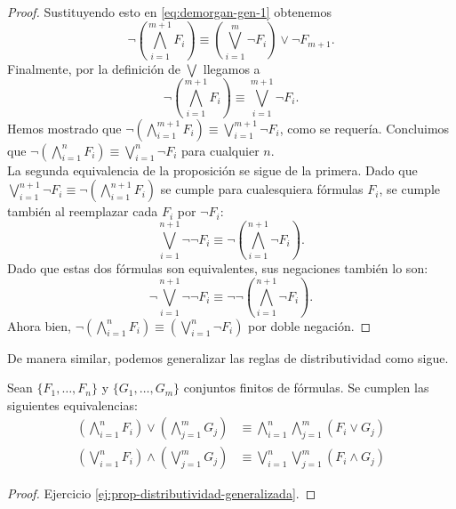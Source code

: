 \message{ !name(main.tex)}\documentclass[12pt,a4paper]{book}
\begin{document}
\begin{proof}
        Sustituyendo esto en \eqref{eq:demorgan-gen-1} obtenemos
        \begin{equation*}
            \neg\left(\bigwedge_{i=1}^{m+1}F_{i}\right)\equiv\left(\bigvee_{i=1}^{m}\neg F_{i}\right)\vee\neg F_{m+1}.
        \end{equation*}
        Finalmente, por la definición de $\bigvee$ llegamos a
        \begin{equation*}
            \neg\left(\bigwedge_{i=1}^{m+1}F_{i}\right)\equiv\bigvee_{i=1}^{m+1}\neg F_{i}.
        \end{equation*}
        Hemos mostrado que $\neg\left(\bigwedge_{i=1}^{m+1}F_{i}\right)\equiv\bigvee_{i=1}^{m+1}\neg F_{i}$, como se requería.
        Concluimos que $\neg\left(\bigwedge_{i=1}^{n}F_{i}\right)\equiv\bigvee_{i=1}^{n}\neg F_{i}$ para cualquier $n$.\\
        La segunda equivalencia de la proposición se sigue de la primera. Dado que
        $\bigvee_{i=1}^{n+1}\neg F_{i}\equiv\neg\left(\bigwedge_{i=1}^{n+1}F_{i}\right)$ se cumple para cualesquiera fórmulas
        $F_{i}$, se cumple también al reemplazar cada $F_{i}$ por $\neg F_{i}$:
        \begin{equation*}
            \bigvee_{i=1}^{n+1}\neg\neg F_{i}\equiv\neg\left(\bigwedge_{i=1}^{n+1}\neg F_{i}\right).
        \end{equation*}
        Dado que estas dos fórmulas son equivalentes, sus negaciones también lo son:
        \begin{equation*}
            \neg\bigvee_{i=1}^{n+1}\neg\neg F_{i}\equiv\neg\neg\left(\bigwedge_{i=1}^{n+1}\neg F_{i}\right).
        \end{equation*}
        Ahora bien, $\neg\left(\bigwedge_{i=1}^{n}F_{i}\right)\equiv\left(\bigvee_{i=1}^{n}\neg F_{i}\right)$ por doble negación.
    \end{proof}

    De manera similar, podemos generalizar las reglas de distributividad como sigue.

    \begin{proposicion}\label{prop:distributividad-generalizada}
        Sean $\{F_{1},\dots,F_{n}\}$ y $\{G_{1},\dots,G_{m}\}$ conjuntos finitos de fórmulas. Se cumplen las siguientes
        equivalencias:
        \begin{align*}
            \left(\bigwedge_{i=1}^{n}F_{i}\right)\vee\left(\bigwedge_{j=1}^{m}G_{j}\right)&\equiv
            \bigwedge_{i=1}^{n}\bigwedge_{j=1}^{m}(F_{i}\vee G_{j})\\
            \left(\bigvee_{i=1}^{n}F_{i}\right)\wedge\left(\bigvee_{j=1}^{m}G_{j}\right)&\equiv
            \bigvee_{i=1}^{n}\bigvee_{j=1}^{m}(F_{i}\wedge G_{j})
        \end{align*}
    \end{proposicion}
    \begin{proof}
        Ejercicio \ref{ej:prop-distributividad-generalizada}.
    \end{proof}
\end{document}
